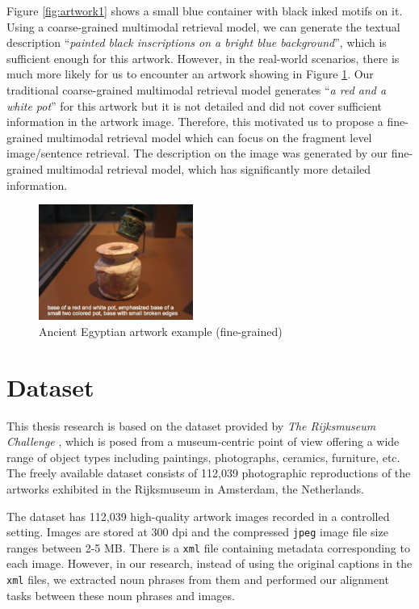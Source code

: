Figure \ref{fig:artwork1} shows a small blue container with black inked motifs on it. Using a coarse-grained multimodal retrieval model, we can generate the textual description ``\textit{painted black inscriptions on a bright blue background}'', which is sufficient enough for this artwork. However, in the real-world scenarios, there is much more likely for us to encounter an artwork showing in Figure \ref{fig:artwork2}. Our traditional coarse-grained multimodal retrieval model generates ``\textit{a red and a white pot}'' for this artwork but it is not detailed and did not cover sufficient information in the artwork image. Therefore, this motivated us to propose a fine-grained multimodal retrieval model which can focus on the fragment level image/sentence retrieval. The description on the image was generated by our fine-grained multimodal retrieval model, which has significantly more detailed information.

\begin{figure}[h!]
\centering
\includegraphics[width=0.45\textwidth]{artwork_fine2.pdf}
\caption{Ancient Egyptian artwork example (fine-grained)}
\label{fig:artwork2}
\end{figure}

\section{Dataset}

This thesis research is based on the dataset provided by \textit{The Rijksmuseum Challenge} \cite{MensinkICMIR2014}, which is posed from a museum-centric point of view offering a wide range of object types including paintings, photographs, ceramics, furniture, etc. The freely available dataset consists of 112,039 photographic reproductions of the artworks exhibited in the Rijksmuseum in Amsterdam, the Netherlands. 

The dataset has 112,039 high-quality artwork images recorded
in a controlled setting. Images are stored at 300 dpi and the
compressed \verb|jpeg| image file size ranges between 2-5 MB. There is a \verb|xml| file containing metadata corresponding to each image. However, in our research, instead of using the original captions in the \verb|xml| files, we extracted noun phrases from them and performed our alignment tasks between these noun phrases and images.

